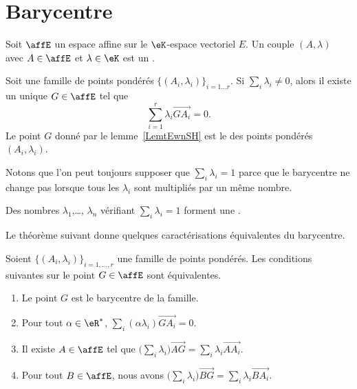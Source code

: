 \section{Barycentre}

Soit \( \affE\) un espace affine sur le \( \eK\)-espace vectoriel \( E\). Un couple \( (A,\lambda)\) avec \( A\in \affE\) et \( \lambda\in \eK\) est un .

\begin{lemmaDef}        \label{LemtEwnSH}
	Soit une famille de points pondérés \( \{ (A_i,\lambda_i) \}_{i=1\ldots r}\). Si \( \sum_i\lambda_i\neq 0\), alors il existe un unique \( G\in \affE\) tel que
	\begin{equation}
		\sum_{i=1}^r\lambda_i\overrightarrow{ GA_i }=0.
	\end{equation}
	Le point \( G\) donné par le lemme~\ref{LemtEwnSH} est le  des points pondérés \( (A_i,\lambda_i)\).
\end{lemmaDef}


Notons que l'on peut toujours supposer que \( \sum_i\lambda_i=1\) parce que le barycentre ne change pas lorsque tous les \( \lambda_i\) sont multipliés par un même nombre.
\begin{definition}\label{DefIMZooLFdIUB}
	Des nombres \( \lambda_1\),\ldots, \( \lambda_n\) vérifiant \( \sum_i\lambda_i=1\) forment une .
\end{definition}

Le théorème suivant donne quelques caractérisations équivalentes du barycentre.
\begin{theorem}      \label{ThoIJVzxr}
	Soient \( \{ (A_i,\lambda_i) \}_{i=1,\ldots, r}\) une famille de points pondérés. Les conditions suivantes sur le point \( G\in \affE\) sont équivalentes.
	\begin{enumerate}
		\item
		      Le point \( G\) est le barycentre de la famille.
		\item
		      Pour tout \( \alpha\in \eR^*\), \( \sum_i(\alpha\lambda_i)\overrightarrow{ GA_i }=0\).
		\item
		      Il existe \( A\in\affE\) tel que \( \big( \sum_i\lambda_i \big)\overrightarrow{ AG }=\sum_i\lambda_i\overrightarrow{ AA_i }\).
		\item   \label{ItemEgOQBX}
		      Pour tout \( B\in\affE\), nous avons \( \big( \sum_i\lambda_i \big)\overrightarrow{ BG }=\sum_i\lambda_i\overrightarrow{ BA_i }\).
	\end{enumerate}
\end{theorem}

